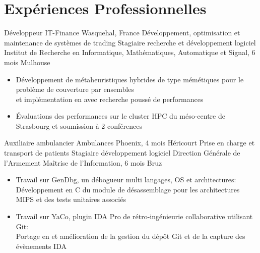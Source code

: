 \documentclass[a4paper,10pt,sans]{moderncv}
\renewcommand{\deletedSpace}{-2mm}
\begin{document}

	\vspace*{\deletedSpace}
	\section{Expériences Professionnelles}
			{Développeur \Cpp{}}
			{IT-Finance}
			{Wasquehal, France}
			{Développement, optimisation et maintenance de systèmes de trading}
			{}
			{Stagiaire recherche et développement logiciel}
			{Institut de Recherche en Informatique, Mathématiques, Automatique et Signal, 6 mois\hspace{-25pt}}
			{Mulhouse}
			{}
			{}
			\vspace{-5pt}
			\begin{itemize}
				\item Développement de métaheuristiques hybrides de type mémétiques pour le problème de couverture par ensembles\\
				et implémentation en \Cpp{} avec recherche poussé de performances
				\item Évaluations des performances sur le cluster HPC du méso-centre de Strasbourg et soumission à 2 conférences \cite{Pinard2020}
			\end{itemize}
			\vspace{5pt}
			{Auxiliaire ambulancier}
			{Ambulances Phoenix, 4 mois}
			{Héricourt}
			{Prise en charge et transport de patients}
			{}
			{Stagiaire développement logiciel}
			{Direction Générale de l'Armement Maîtrise de l'Information, 6 mois}
			{Bruz}
			{}
			{}
			\vspace{-5pt}
			\begin{itemize}
				\item Travail sur GenDbg, un débogueur multi langages, OS et architectures:\\
					\phantom{=}Développement en C du module de désassemblage pour les architectures MIPS et des tests unitaires associés
				\item Travail sur YaCo, plugin IDA Pro de rétro-ingénieurie collaborative utilisant Git:\\
					\phantom{=}Portage en \Cpp{} et amélioration de la gestion du dépôt Git et de la capture des évènements IDA
			\end{itemize}
\end{document}
